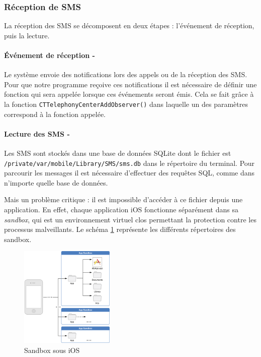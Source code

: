\subsubsection{Réception de SMS}

La réception des SMS se décomposent en deux étapes : l'événement de réception, puis la lecture.

\paragraph{Événement de réception -}
Le système envoie des notifications lors des appels ou de la réception des SMS.
Pour que notre programme reçoive ces notifications il est nécessaire de définir une fonction qui sera appelée lorsque ces événements seront émis.
Cela se fait grâce à la fonction \lstinline{CTTelephonyCenterAddObserver()} dans laquelle un des paramètres correspond à la fonction appelée.



\paragraph{Lecture des SMS -}
Les SMS sont stockés dans une base de données SQLite dont le fichier est \lstinline{/private/var/mobile/Library/SMS/sms.db} dans le répertoire du terminal.
Pour parcourir les messages il est nécessaire d'effectuer des requêtes SQL, comme dans n'importe quelle base de données.

Mais un problème critique : il est impossible d'accéder à ce fichier depuis une application.
En effet, chaque application iOS fonctionne séparément dans sa \textit{sandbox}, qui est un environnement virtuel clos permettant la protection contre les processus malveillants.
Le schéma \ref{iOS_sandbox} représente les différents répertoires des sandbox.
\begin{figure}[!h]
	\center
	\includegraphics[width=0.4\textwidth]{img/iOS_sandbox.png}
	\caption{Sandbox sous iOS}
	\label{iOS_sandbox}
\end{figure}


